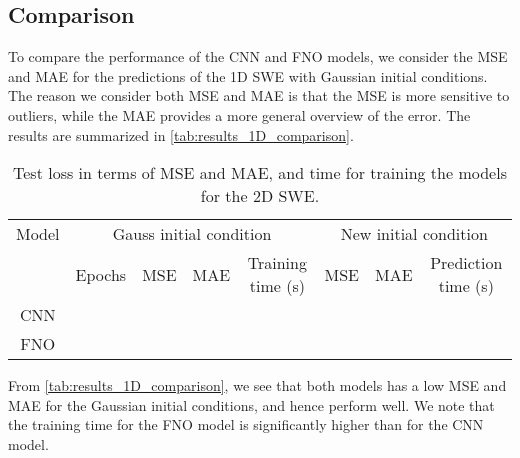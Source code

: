 \subsection*{Comparison}
To compare the performance of the CNN and FNO models, we consider the MSE and MAE for the predictions of the 1D SWE with Gaussian initial conditions.
The reason we consider both MSE and MAE is that the MSE is more sensitive to outliers, while the MAE provides a more general overview of the error.
The results are summarized in \autoref{tab:results_1D_comparison}.
\begin{table}[H]
    \centering
    \small %
    \begin{tabular}{c|cccc|ccc}
        Model & \multicolumn{4}{c|}{Gauss initial condition} & \multicolumn{3}{c}{New initial condition} \\
        \cline{2-8}
        & Epochs & MSE & MAE & Training time (s)  & MSE & MAE & Prediction time (s) \\
        \hline
        CNN  &
         &
         & 
         &
         &
         &
         &
         
        \\
        \hline
        FNO  &
         &
         &
         &
         &
         &
         &
        
        \\
        \hline
    \end{tabular}
    \caption{Test loss in terms of MSE and MAE, and time for training the models for the 2D SWE.}\label{tab:results_1D_comparison}
\end{table}
From \autoref{tab:results_1D_comparison}, we see that both models has a low MSE and MAE for the Gaussian initial conditions, and hence perform well.
We note that the training time for the FNO model is significantly higher than for the CNN model.



